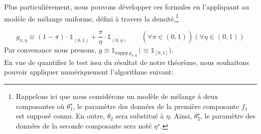 \documentclass{article}
\begin{document}
    Plus particulièrement, nous pouvons développer ces formules en l'appliquant au modèle de mélange uniforme, défini à travers la densité,\footnote{Rappelons ici que nous considérons un modèle de mélange à deux composantes où $\theta_1^\star$, le paramètre des données de la première composante $f_1$ est supposé connu. En outre, $\theta_2$ sera substitué à $\eta$. Ainsi, $\theta_2^\star$, le paramètre des données de la seconde composante sera noté $\eta^\star$.}

    $$ g_{\pi,\eta} \equiv (1-\pi)\cdot\mathbb{1}_{\overline{(0,1)}} + \dfrac{\pi}{\eta}\cdot\mathbb{1}_{\overline{(0,\eta)}} \qquad (\forall\pi\in\overline{(0,1)})(\forall\eta\in(0,1))$$
    Par convenance nous prenons, $g\equiv\mathbb{1}_{\mathrm{suppp}\,g_{\pi,\eta}}\,\big( \equiv \mathbb{1}_{[0,1]} \big)$. \\

    En vue de quantifier le test issu du résultat de notre théorème, nous souhaitons pouvoir appliquer numériquement l'algorithme suivant:
\end{document}
